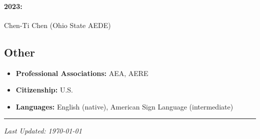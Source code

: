 \documentclass[11pt]{res} %
\begin{document}
\begin{resume}
\paragraph{2023:} Chen-Ti Chen (Ohio State AEDE)

\vspace{-.2in}




\subsection{Other}

\begin{itemize}
	\item[] \textbf{Professional Associations:} AEA, AERE
	\item[] \textbf{Citizenship:} U.S.
	\item[] \textbf{Languages:} English (native), American Sign Language (intermediate)
\end{itemize}
\hrule

\vspace{0.1in} %



\centerline{\emph{Last Updated: \today}}
\pagebreak



\end{resume}
\end{document}
